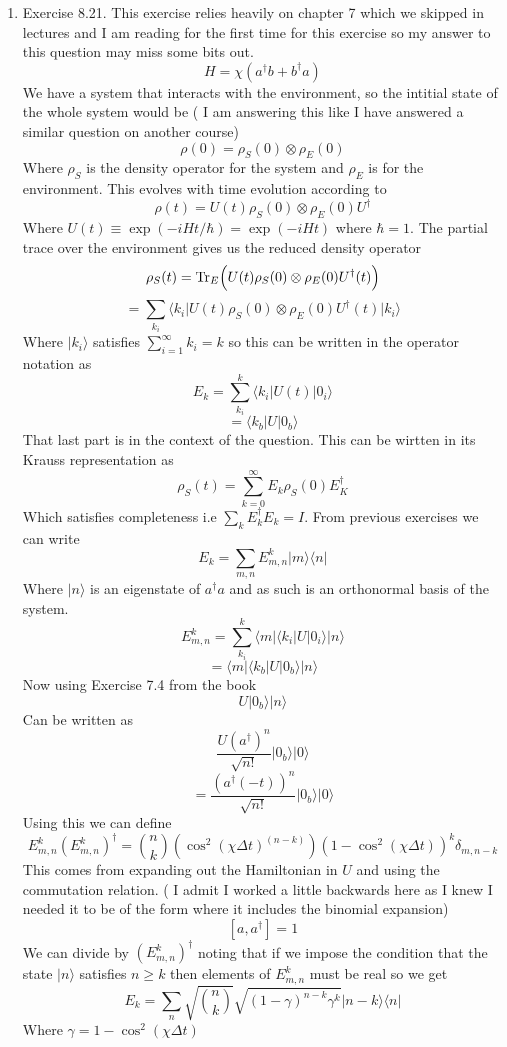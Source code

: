 \documentclass[12pt]{article}
\newcommand{\Tr}{{\rm Tr}}
\newcommand{\ket}[1]{\vert{#1}\rangle}
\newcommand{\bra}[1]{\langle{#1}\vert}
\begin{document}
\begin{enumerate}
    \item Exercise 8.21. This exercise relies heavily on chapter 7 which we skipped in lectures and I am reading for the first time for this exercise so my answer to this question may miss some bits out. 
    $$ H = \chi ( a^{\dagger} b + b^{\dagger} a) $$
    We have a system that interacts with the environment, so the intitial state of the whole system would be ( I am answering this like I have answered a similar question on another course)
    $$ \rho (0) = \rho_S (0) \otimes \rho_E (0) $$
    Where $\rho_S$ is the density operator for the system and $\rho_E$ is for the environment. This evolves with time evolution according to 
    $$ \rho (t) = U(t) \rho_S (0) \otimes \rho_E (0) U^{\dagger} $$
    Where $U(t) \equiv \exp (-i H t/ \hbar) = \exp (-i Ht) $ where $\hbar =1$. The partial trace over the environment gives us the reduced density operator 
    $$ \rho_S (t) = \Tr_E \Big( U(t) \rho_S (0) \otimes \rho_E (0) U^{\dagger} (t) \Big) $$
    $$ = \sum_{k_i} \bra{k_i} U(t) \rho_S (0) \otimes \rho_E (0) U^{\dagger} (t) \ket{k_i} $$
    Where $\ket{k_i}$ satisfies $\sum_{i=1}^{\infty} k_i = k$ so this can be written in the operator notation as 
    $$ E_k = \sum_{k_i}^k \bra{k_i} U(t) \ket{0_i} $$
    $$ = \bra{k_b} U \ket{0_b} $$ 
    That last part is in the context of the question. This can be wirtten in its Krauss representation as 
    $$ \rho_S (t) = \sum_{k=0}^{\infty} E_k \rho_S (0) E_K^{\dagger} $$
    Which satisfies completeness i.e $\sum_k E^{\dagger}_k E_k = I$. From previous exercises we can write 
    $$ E_k = \sum_{m,n} E_{m,n}^k \ket{m} \bra{n} $$ 
    Where $\ket{n}$ is an eigenstate of $a^{\dagger} a$ and as such is an orthonormal basis of the system. 
    $$ E_{m,n}^k = \sum_{k_i}^k \bra{m} \bra{k_i} U \ket{0_i} \ket{n} $$
    $$ = \bra{m} \bra{k_b} U \ket{0_b} \ket{n} $$
    Now using Exercise 7.4 from the book 
    $$ U \ket{0_b} \ket{n} $$ 
    Can be written as 
    $$ \frac{U (a^{\dagger})^n}{\sqrt{n!}} \ket{0_b} \ket{0} $$
    $$ = \frac{(a^{\dagger} (-t) )^n}{\sqrt{n!}} \ket{0_b} \ket{0} $$
    Using this we can define 
    $$ E^k_{m,n} (E^k_{m,n})^{\dagger} = \binom{n}{k}(\cos^2(\chi \Delta t)^{(n-k)}) (1-\cos^2(\chi \Delta t))^k \delta_{m,n-k} $$
    This comes from expanding out the Hamiltonian in $U$ and using the commutation relation. ( I admit I worked a little backwards here as I knew I needed it to be of the form where it includes the binomial expansion)
    $$ [a,a^{\dagger}] = 1 $$
    We can divide by $(E^k_{m,n})^{\dagger}$ noting that if we impose the condition that the state $\ket{n}$ satisfies $n \geq k$ then elements of $E^k_{m,n}$ must be real so we get 
    $$ E_k = \sum_n \sqrt{\binom{n}{k}} \sqrt{(1- \gamma)^{n-k} \gamma^k} \ket{n-k} \bra{n} $$
    Where $\gamma = 1 - \cos^2(\chi \Delta t)$
\end{enumerate}
\end{document}
